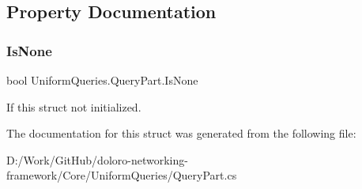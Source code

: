 \subsection{Property Documentation}
\mbox{\label{struct_uniform_queries_1_1_query_part_af380375ca82e9dc2eecf899b5933fe2b}} 
\subsubsection{\texorpdfstring{Is\+None}{IsNone}}
{\footnotesize\ttfamily bool Uniform\+Queries.\+Query\+Part.\+Is\+None\hspace{0.3cm}{\ttfamily [get]}}



If this struct not initialized. 



The documentation for this struct was generated from the following file\+:\begin{DoxyCompactItemize}
\item 
D\+:/\+Work/\+Git\+Hub/doloro-\/networking-\/framework/\+Core/\+Uniform\+Queries/Query\+Part.\+cs\end{DoxyCompactItemize}
